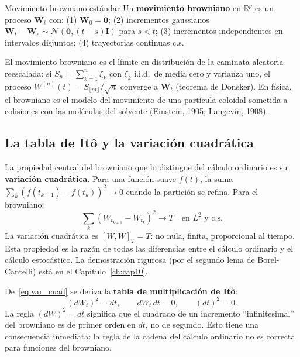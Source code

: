 \begin{definicion}{Movimiento browniano estándar}
\label{def:browniano}
Un \textbf{movimiento browniano} en $\mathbb{R}^p$ es un proceso
$\bm{W}_t$ con: (1) $\bm{W}_0 = \bm{0}$; (2) incrementos gaussianos
$\bm{W}_t - \bm{W}_s \sim \mathcal{N}(\bm{0},(t-s)\bm{I})$ para
$s < t$; (3) incrementos independientes en intervalos disjuntos; (4)
trayectorias continuas c.s.
\end{definicion}

El movimiento browniano es el límite en distribución de la caminata
aleatoria reescalada: si $S_n = \sum_{k=1}^n \xi_k$ con $\xi_k$ i.i.d.\
de media cero y varianza uno, el proceso
$W^{(n)}(t) = S_{\lfloor nt\rfloor}/\sqrt{n}$ converge a $\bm{W}_t$
(teorema de Donsker). En física, el browniano es el modelo del movimiento
de una partícula coloidal sometida a colisiones con las moléculas del
solvente (Einstein, 1905; Langevin, 1908).

\subsection{La tabla de Itô y la variación cuadrática}
\label{subsec:tabla_ito}

La propiedad central del browniano que lo distingue del cálculo ordinario
es su \textbf{variación cuadrática}. Para una función suave $f(t)$, la
suma $\sum_k (f(t_{k+1})-f(t_k))^2 \to 0$ cuando la partición se
refina. Para el browniano:
\begin{equation}
  \sum_k (W_{t_{k+1}}-W_{t_k})^2 \to T \quad \text{en } L^2 \text{ y c.s.}
  \label{eq:var_cuad}
\end{equation}
La variación cuadrática es $[W,W]_T = T$: no nula, finita, proporcional
al tiempo. Esta propiedad es la razón de todas las diferencias entre el
cálculo ordinario y el cálculo estocástico. La demostración rigurosa (por
el segundo lema de Borel-Cantelli) está en el
Capítulo~\ref{ch:cap10}.

De~\eqref{eq:var_cuad} se deriva la \textbf{tabla de multiplicación de
Itô}:
\begin{equation}
  (dW_t)^2 = dt, \qquad dW_t\,dt = 0, \qquad (dt)^2 = 0.
  \label{eq:tabla_ito}
\end{equation}
La regla $(dW)^2 = dt$ significa que el cuadrado de un incremento
``infinitesimal'' del browniano es de primer orden en $dt$, no de segundo.
Esto tiene una consecuencia inmediata: la regla de la cadena del cálculo
ordinario no es correcta para funciones del browniano.

